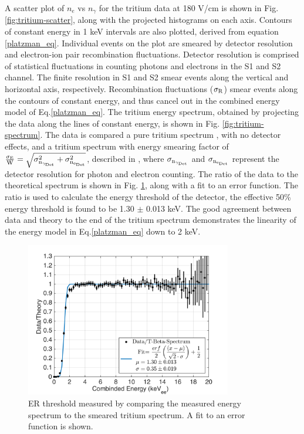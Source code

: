 
A scatter plot of $n_e$ vs $n_{\gamma}$ for the tritium data at 180 V/cm is shown in Fig. \ref{fig:tritium-scatter}, along with the projected histograms on each axis. Contours of constant energy in 1 keV intervals are also plotted, derived from equation \ref{platzman_eq}. Individual events on the plot are smeared by detector resolution and electron-ion pair recombination fluctuations. Detector resolution is comprised of statistical fluctuations in counting photons and electrons in the S1 and S2 channel. The finite resolution in S1 and S2 smear events along the vertical and horizontal axis, respectively. Recombination fluctuations ($\rm \sigma_R$) smear events along the contours of constant energy, and thus cancel out in the combined energy model of Eq.\ref{platzman_eq}. The tritium energy spectrum, obtained by projecting the data along the lines of constant energy, is shown in Fig. \ref{fig:tritium-spectrum}. The data is compared a pure tritium spectrum \cite{Tritium_Eq_Simpson}, with no detector effects, and a tritium spectrum with energy smearing factor of $\rm \frac{\sigma_E}{W} = \sqrt{\sigma_{n_{\gamma_{Det}}}^2 + \sigma_{n_{e_{Det}}}^2}$, described in \cite{Dobi_Thesis}, where $\rm \sigma_{n_{\gamma_{Det}}}$ and $\rm \sigma_{n_{e_{Det}}}$ represent the detector resolution for photon and electron counting. The ratio of the data to the theoretical spectrum is shown in Fig. \ref{fig:ER-threshold}, along with a fit to an error function. The ratio is used to calculate the energy threshold of the detector, the effective 50\% energy threshold is found to be 1.30 $\pm$ 0.013 keV. The good agreement between data and theory to the end of the tritium spectrum demonstrates the linearity of the energy model in Eq.\ref{platzman_eq} down to 2 keV.

\begin{figure}[h!]\centering
\includegraphics[width=90mm]{fig/E_Thres_Fit.png}
\caption{ER threshold measured by comparing the measured energy spectrum to the smeared tritium spectrum. A fit to an error function is shown.}
\label{fig:ER-threshold}
\end{figure}


